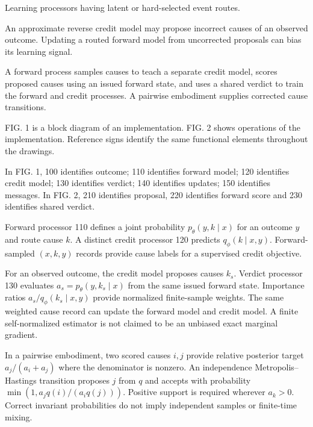 \documentclass[pct]{sm-patent}
\begin{document}
\descriptionstart


\pnum Learning processors having latent or hard-selected event routes.


\pnum An approximate reverse credit model may propose incorrect causes of an observed outcome. Updating a routed forward model from uncorrected proposals can bias its learning signal.


\pnum A forward process samples causes to teach a separate credit model, scores proposed causes using an issued forward state, and uses a shared verdict to train the forward and credit processes. A pairwise embodiment supplies corrected cause transitions.


\pnum FIG. 1 is a block diagram of an implementation. FIG. 2 shows operations of the implementation. Reference signs identify the same functional elements throughout the drawings.


\pnum In FIG. 1, 100 identifies outcome; 110 identifies forward model; 120 identifies credit model; 130 identifies verdict; 140 identifies updates; 150 identifies messages. In FIG. 2, 210 identifies proposal, 220 identifies forward score and 230 identifies shared verdict.

\pnum Forward processor 110 defines a joint probability $p_\theta(y,k\mid x)$ for an outcome $y$ and route cause $k$. A distinct credit processor 120 predicts $q_\phi(k\mid x,y)$. Forward-sampled $(x,k,y)$ records provide cause labels for a supervised credit objective.

\pnum For an observed outcome, the credit model proposes causes $k_s$. Verdict processor 130 evaluates $a_s=p_\theta(y,k_s\mid x)$ from the same issued forward state. Importance ratios $a_s/q_\phi(k_s\mid x,y)$ provide normalized finite-sample weights. The same weighted cause record can update the forward model and credit model. A finite self-normalized estimator is not claimed to be an unbiased exact marginal gradient.

\pnum In a pairwise embodiment, two scored causes $i,j$ provide relative posterior target $a_j/(a_i+a_j)$ where the denominator is nonzero. An independence Metropolis--Hastings transition proposes $j$ from $q$ and accepts with probability $\min(1,a_jq(i)/(a_iq(j)))$. Positive support is required wherever $a_k>0$. Correct invariant probabilities do not imply independent samples or finite-time mixing.
\end{document}
